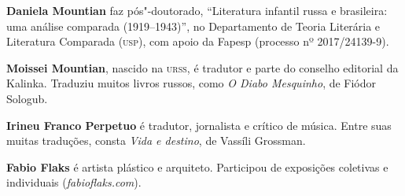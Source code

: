 \noindent\textbf{Daniela Mountian} faz pós"-doutorado,
  ``Literatura infantil russa e brasileira: uma análise comparada
  (1919--1943)'', no Departamento de Teoria Literária e Literatura
  Comparada (\textsc{usp}), com apoio da Fapesp (processo nº 2017/24139-9).

\noindent\textbf{Moissei Mountian}, nascido na \textsc{urss}, é tradutor e parte do
conselho editorial da Kalinka. Traduziu muitos livros russos, como
\emph{O Diabo Mesquinho}, de Fiódor Sologub.

\medskip

\noindent\textbf{Irineu Franco Perpetuo} é tradutor, jornalista e crítico de
música. Entre suas muitas traduções, consta \emph{Vida e destino}, de
Vassíli Grossman.

\medskip

\noindent\textbf{Fabio Flaks} é artista plástico e arquiteto. Participou de
exposições coletivas e individuais (\textit{fabioflaks.com}).

